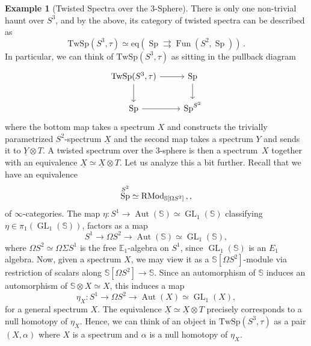 \documentclass[10pt]{amsart}
\theoremstyle{plain}
\theoremstyle{definition}
\newtheorem{example}[theorem]{Example}
\DeclareMathOperator{\Aut}{Aut}
\DeclareMathOperator{\Sp}{Sp}
\DeclareMathOperator{\Fun}{Fun}
\def\on{\operatorname}
\newcommand{\bE}{\mathbb{E}}
\newcommand{\bS}{\mathbb{S}}
\newcommand{\TwSp}{\mathrm{TwSp}}
\begin{document}
\begin{example}[Twisted Spectra over the 3-Sphere]
  There is only one non-trivial haunt over $S^3$, and by the above, its category of twisted spectra can be described as
  \[
  \TwSp(S^3,\tau) \simeq \mathrm{eq} \left(\Sp \rightrightarrows \Fun(S^2,\Sp) \right) \,.
  \]
  In particular, we can think of $\TwSp(S^3,\tau)$ as sitting in the pullback diagram
  \[
  \begin{tikzcd}
    \TwSp(S^3,\tau) \arrow[r] \arrow[d] & \Sp \arrow[d] \\
    \Sp \arrow[r] & \Sp^{S^2}
  \end{tikzcd}
  \]
  where the bottom map takes a spectrum $X$ and constructs the trivially parametrized $S^2$-spectrum $\underline{X}$ and the second map takes a spectrum $Y$ and sends it to $\underline{Y} \otimes T$. A twisted spectrum over the 3-sphere is then a spectrum~$X$ together with an equivalence $\underline{X} \simeq \underline{X} \otimes T$.
  Let us analyze this a bit further.
  Recall that we have an equivalence
  \[
  \Sp^{S^2} \simeq \on{RMod}_{\bS[\Omega S^2]}\\,,
  \]
  of $\infty$-categories.
  The map $\eta: S^1 \to \Aut(\bS) \simeq \on{GL}_1(\bS)$ classifying $\eta \in \pi_1(\on{GL}_1(\bS))$, factors  as a map
    \[
  S^1 \to \Omega S^2 \to \Aut(\bS) \simeq \on{GL}_1(\bS),
  \]
  where $\Omega S^2 \simeq \Omega \Sigma S^1$ is the free $\bE_1$-algebra on $S^1$, since $\on{GL}_1(\bS)$ is an $E_1$ algebra.
  Now, given a spectrum $X$, we may view it as a $\bS[\Omega S^2]$-module via restriction of scalars along $\bS[\Omega S^2] \to \bS$.
  Since an automorphism of $\bS$ induces an automorphism of $\bS \otimes X \simeq X$,  this induces a map
  \[
 \eta_X: S^1 \to \Omega S^2 \to \Aut(X) \simeq \on{GL}_1(X),
  \]
for a general spectrum $X$.
The equivalence $\underline{X} \simeq \underline{X} \otimes T$ precisely corresponds to a null homotopy of $\eta_X$.
Hence, we can think of an object in $\TwSp(S^3,\tau)$ as a pair $(X,\alpha)$ where $X$ is a spectrum and $\alpha$ is a null homotopy of $\eta_X$.
\end{example}
\end{document}
